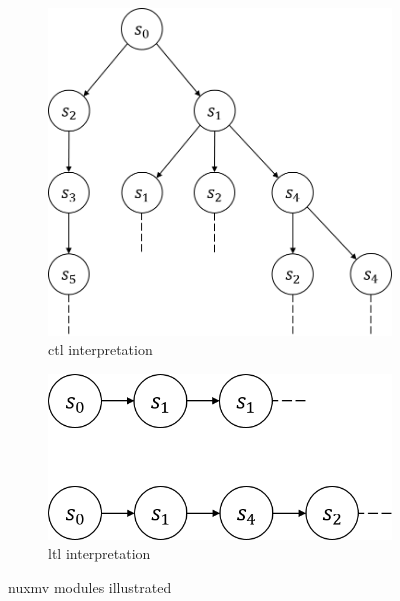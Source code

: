 \begin{figure}
\begin{subfigure}[b]{\subfigw}
        \includegraphics[scale=\figscale]{figures/ctl-interpretation.png}
        \caption{\gls{ctl} interpretation}
        \label{fig:ctl-int}
    \end{subfigure}
    \begin{subfigure}[b]{\subfigw}
        \centering
        \includegraphics[scale=\figscale]{figures/ltl-interpretation.png}
        \caption{\gls{ltl} interpretation}
    \end{subfigure}
    \caption{\gls{nuxmv} modules illustrated}
\end{figure}



